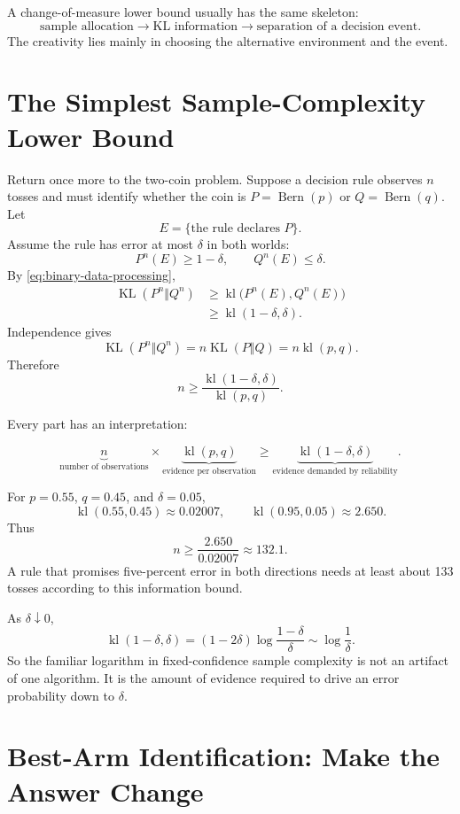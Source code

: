\documentclass[en,nofont,11pt]{elegantbook}
\newcommand{\KL}{\operatorname{KL}}
\newcommand{\kl}{\operatorname{kl}}
\newcommand{\Ber}{\operatorname{Bern}}
\begin{document}
\begin{patternbox}
A change-of-measure lower bound usually has the same skeleton:
\[
\text{sample allocation}
\longrightarrow
\text{KL information}
\longrightarrow
\text{separation of a decision event}.
\]
The creativity lies mainly in choosing the alternative environment and the event.
\end{patternbox}

\chapter{The Simplest Sample-Complexity Lower Bound}

Return once more to the two-coin problem. Suppose a decision rule observes $n$ tosses and must identify whether the coin is $P=\Ber(p)$ or $Q=\Ber(q)$. Let
\[
E=\{\text{the rule declares }P\}.
\]
Assume the rule has error at most $\delta$ in both worlds:
\[
P^n(E)\geq 1-\delta,
\qquad
Q^n(E)\leq\delta.
\]
By \eqref{eq:binary-data-processing},
\begin{align*}
\KL(P^n\Vert Q^n)
&\geq
\kl\bigl(P^n(E),Q^n(E)\bigr)\\
&\geq
\kl(1-\delta,\delta).
\end{align*}
Independence gives
\[
\KL(P^n\Vert Q^n)=n\KL(P\Vert Q)=n\kl(p,q).
\]
Therefore
\begin{equation}
\boxed{
 n
 \geq
 \frac{\kl(1-\delta,\delta)}{\kl(p,q)}.
}
\label{eq:coin-lower-bound}
\end{equation}

Every part has an interpretation:

\[
\underbrace{n}_{\text{number of observations}}
\times
\underbrace{\kl(p,q)}_{\text{evidence per observation}}
\geq
\underbrace{\kl(1-\delta,\delta)}_{\text{evidence demanded by reliability}}.
\]

For $p=0.55$, $q=0.45$, and $\delta=0.05$,
\[
\kl(0.55,0.45)\approx0.02007,
\qquad
\kl(0.95,0.05)\approx2.650.
\]
Thus
\[
n\geq\frac{2.650}{0.02007}\approx132.1.
\]
A rule that promises five-percent error in both directions needs at least about 133 tosses according to this information bound.

As $\delta\downarrow0$,
\[
\kl(1-\delta,\delta)
=(1-2\delta)\log\frac{1-\delta}{\delta}
\sim
\log\frac{1}{\delta}.
\]
So the familiar logarithm in fixed-confidence sample complexity is not an artifact of one algorithm. It is the amount of evidence required to drive an error probability down to $\delta$.

\chapter{Best-Arm Identification: Make the Answer Change}
\end{document}
